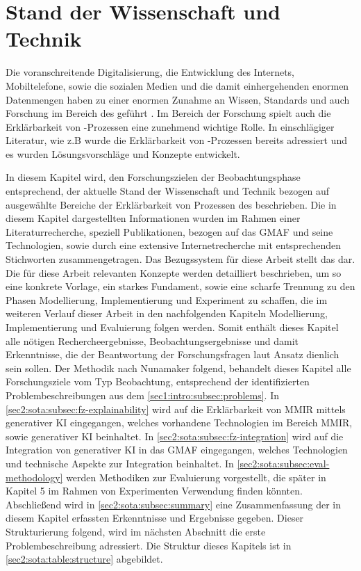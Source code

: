 \section{Stand der Wissenschaft und Technik}
\label{sec2:sota}
Die voranschreitende Digitalisierung, die Entwicklung des Internets, Mobiltelefone, sowie die sozialen Medien und die damit einhergehenden enormen Datenmengen haben zu einer enormen Zunahme an Wissen, Standards und auch Forschung im Bereich des \mmir{} geführt \cite{swa_diss}.
Im Bereich der Forschung spielt auch die Erklärbarkeit von \mmir{}-Prozessen eine zunehmend wichtige Rolle.
In einschlägiger Literatur, wie z.B \cite{swa_diss} wurde die Erklärbarkeit von \mmir{}-Prozessen bereits adressiert und es wurden Lösungsvorschläge und Konzepte entwickelt.

In diesem Kapitel wird, den Forschungszielen der Beobachtungsphase entsprechend, der aktuelle Stand der Wissenschaft und Technik bezogen auf ausgewählte Bereiche der Erklärbarkeit von Prozessen des \mmir{} beschrieben.
Die in diesem Kapitel dargestellten Informationen wurden im Rahmen einer Literaturrecherche, speziell Publikationen, bezogen auf das GMAF und seine Technologien, sowie durch eine extensive Internetrecherche mit entsprechenden Stichworten zusammengetragen.
Das Bezugssystem für diese Arbeit stellt das \gmaf{} dar.
Die für diese Arbeit relevanten Konzepte werden detailliert beschrieben, um so eine konkrete Vorlage, ein starkes Fundament, sowie eine scharfe Trennung zu den Phasen Modellierung, Implementierung und Experiment zu schaffen, die im weiteren Verlauf dieser Arbeit in den nachfolgenden Kapiteln Modellierung, Implementierung und Evaluierung folgen werden.
Somit enthält dieses Kapitel alle nötigen Rechercheergebnisse, Beobachtungsergebnisse und damit Erkenntnisse, die der Beantwortung der Forschungsfragen laut Ansatz dienlich sein sollen.
Der Methodik nach Nunamaker \cite{nunamaker} folgend, behandelt dieses Kapitel alle Forschungsziele vom Typ Beobachtung, entsprechend der identifizierten Problembeschreibungen aus dem \cref{sec1:intro:subsec:problems}.
In \cref{sec2:sota:subsec:fz-explainability} wird auf die Erklärbarkeit von MMIR mittels generativer KI eingegangen, welches vorhandene Technologien im Bereich MMIR, sowie generativer KI beinhaltet.
In \cref{sec2:sota:subsec:fz-integration} wird auf die Integration von generativer KI in das GMAF eingegangen, welches Technologien und technische Aspekte zur Integration beinhaltet.
In \cref{sec2:sota:subsec:eval-methodology} werden Methodiken zur Evaluierung vorgestellt, die später in Kapitel 5 im Rahmen von Experimenten Verwendung finden könnten.
Abschließend wird in \cref{sec2:sota:subsec:summary} eine Zusammenfassung der in diesem Kapitel erfassten Erkenntnisse und Ergebnisse gegeben.
Dieser Strukturierung folgend, wird im nächsten Abschnitt die erste Problembeschreibung adressiert.
Die Struktur dieses Kapitels ist in \cref{sec2:sota:table:structure} abgebildet.


